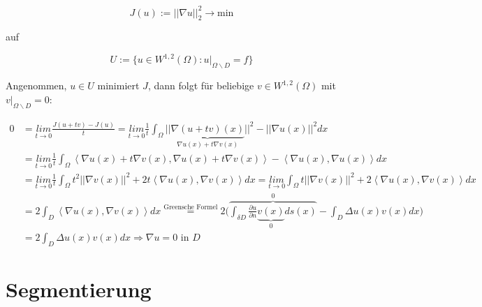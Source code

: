 \documentclass{article}
\theoremstyle{plain}
\theoremstyle{definition}
\numberwithin{equation}{section}
\newcommand{\norm}[1] {
\left|\left| #1 \right|\right|
}
\newcommand{\skprod}[2]{
\left \langle #1,#2 \right \rangle
}
\begin{document}
    \[ J(u):= \norm{\nabla u}_2^2 \to \text{min} \]
    
    auf
    
    \[U:=\{u \in W^{1,2}(\Omega) : u|_{\Omega \backslash D} = f\} \]
    
    Angenommen, $u \in U$ minimiert $J$, dann folgt für beliebige $v \in W^{1,2} (\Omega)$ mit $v|_{\Omega \backslash D}=0$:
    
    \begin{align*}
      0 &= \underset{t \to 0}{lim} \frac{J(u+tv) - J(u)}{t} = \underset{t \to 0}{lim} \frac{1}{t} \int_\Omega ||\underbrace{\nabla(u+tv)(x)}_{\nabla u(x) + t \nabla v(x)}||^2 - \norm{\nabla u(x)}^2 dx\\
      &=\underset{t \to 0}{lim} \frac{1}{t} \int_\Omega \skprod{\nabla u(x) + t \nabla v(x)}{\nabla u(x) + t \nabla v(x)} - \skprod{\nabla u (x)}{\nabla u (x)} dx\\
      &=\underset{t \to 0}{lim} \frac{1}{t} \int_\Omega t^2 \norm{\nabla v(x)}^2 + 2 t \skprod{\nabla u(x)}{\nabla v(x)} dx =  \underset{t \to 0}{lim} \int_\Omega t \norm{\nabla v(x)}^2 + 2 \skprod{\nabla u(x)}{\nabla v(x)} dx\\
      &=2 \int_D \skprod{\nabla u(x)}{\nabla v(x)} dx \overset{\text{Greensche Formel}}{=} 2 \biggl( \overbrace{\int_{\delta D} \frac{\partial u}{\partial n} \underbrace{v(x)}_{0} ds(x)}^{0} - \int_D \Delta u(x) v(x) dx \biggr)\\
      &=2 \int_D \Delta u(x) v(x) dx \Rightarrow \nabla u =0 \text{ in } D
    \end{align*}
    
    \section{Segmentierung}
\end{document}
